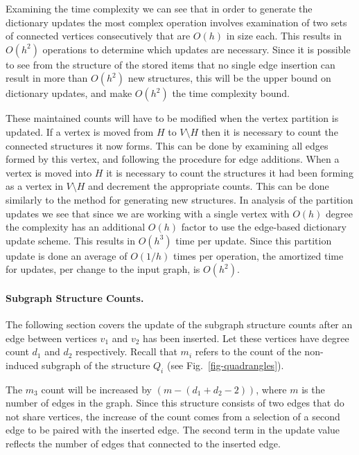\documentclass[11pt]{article}
\renewcommand{\subsection}[1]{\paragraph{\textbf{#1}.}}
\begin{document}
Examining the time complexity we can see that in order to generate the dictionary updates the most complex operation involves examination of two sets of connected vertices consecutively that are $O(h)$ in size each.  This results in $O(h^2)$ operations to determine which updates are necessary.  Since it is possible to see from the structure of the stored items that no single edge insertion can result in more than $O(h^2)$ new structures, this will be the upper bound on dictionary updates, and make $O(h^2)$ the time complexity bound.

These maintained counts will have to be modified when the vertex partition is updated. If a vertex is moved from $H$ to $V \setminus H$ then it is necessary to count the connected structures it now forms.  This can be done by examining all edges formed by this vertex, and following the procedure for edge additions.  
When a vertex is moved into $H$ it is necessary to count the structures it had been forming as a vertex in $V \setminus H$ and decrement the appropriate counts.  This can be done similarly to the method for generating new structures.  In analysis of the partition updates we see that since we are working with a single vertex with $O(h)$ degree the complexity has an additional $O(h)$ factor to use the edge-based dictionary update scheme. This results in $O(h^3)$ time per update.  Since this partition update is done an average of $O(1/h)$ times per operation, the amortized time for updates, per change to the input graph, is $O(h^2)$.


\subsection{Subgraph Structure Counts}



The following section covers the update of the subgraph structure counts after an edge between vertices $v_1$ and $v_2$ has been inserted.  Let these vertices have degree count $d_1$ and $d_2$ respectively. Recall that $m_i$ refers to the count of the non-induced subgraph of the structure $Q_i$ (see Fig.~\ref{fig-quadrangles}).

The $m_3$ count will be increased by $(m-(d_1+d_2-2))$, where $m$ is the number of edges in the graph.  Since this structure consists of two edges that do not share vertices, the increase of the count comes from a selection of a second edge to be paired with the inserted edge.  The second term in the update value reflects the number of edges that connected to the inserted edge.
\end{document}
